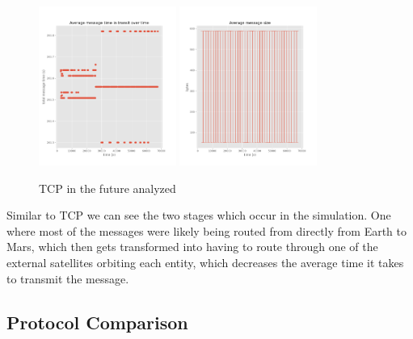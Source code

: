 \documentclass[a4paper,12pt]{article}
\begin{document}
\begin{figure}[h]
  \centering
  \includegraphics[width=0.4\textwidth]{media/new_reno.png}
  \includegraphics[width=0.4\textwidth]{media/new_reno_data.png}
  \caption{TCP in the future analyzed}
\end{figure}

Similar to TCP we can see the two stages which occur in the simulation. One where most of 
the messages were likely being routed from directly from Earth to Mars, which then gets transformed 
into having to route through one of the external satellites orbiting each entity, which decreases the 
average time it takes to transmit the message.

\subsection{Protocol Comparison}
\end{document}
